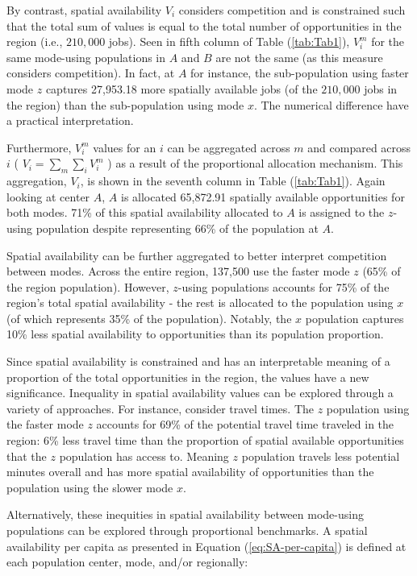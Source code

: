 \documentclass[]{trbunofficial}
\begin{document}
By contrast, spatial availability \(V_i\) considers competition and is
constrained such that the total sum of values is equal to the total
number of opportunities in the region (i.e., \(210,000\) jobs). Seen in
fifth column of Table (\ref{tab:Tab1}), \(V_i^m\) for the same
mode-using populations in \(A\) and \(B\) are not the same (as this
measure considers competition). In fact, at \(A\) for instance, the
sub-population using faster mode \(z\) captures 27,953.18 more spatially
available jobs (of the \(210,000\) jobs in the region) than the
sub-population using mode \(x\). The numerical difference have a
practical interpretation.

Furthermore, \(V_i^m\) values for an \(i\) can be aggregated across
\(m\) and compared across \(i\) ( \(V_i = \sum_m{\sum_i{V_i^m}}\) ) as a
result of the proportional allocation mechanism. This aggregation,
\(V_i\), is shown in the seventh column in Table (\ref{tab:Tab1}). Again
looking at center \(A\), \(A\) is allocated 65,872.91 spatially
available opportunities for both modes. 71\% of this spatial
availability allocated to \(A\) is assigned to the \(z\)-using
population despite representing 66\% of the population at \(A\).

Spatial availability can be further aggregated to better interpret
competition between modes. Across the entire region, 137,500 use the
faster mode \(z\) (65\% of the region population). However, \(z\)-using
populations accounts for 75\% of the region's total spatial availability
- the rest is allocated to the population using \(x\) (of which
represents 35\% of the population). Notably, the \(x\) population
captures 10\% less spatial availability to opportunities than its
population proportion.

Since spatial availability is constrained and has an interpretable
meaning of a proportion of the total opportunities in the region, the
values have a new significance. Inequality in spatial availability
values can be explored through a variety of approaches. For instance,
consider travel times. The \(z\) population using the faster mode \(z\)
accounts for 69\% of the potential travel time traveled in the region:
6\% less travel time than the proportion of spatial available
opportunities that the \(z\) population has access to. Meaning \(z\)
population travels less potential minutes overall and has more spatial
availability of opportunities than the population using the slower mode
\(x\).

Alternatively, these inequities in spatial availability between
mode-using populations can be explored through proportional benchmarks.
A spatial availability per capita as presented in Equation
(\ref{eq:SA-per-capita}) is defined at each population center, mode,
and/or regionally:
\end{document}
